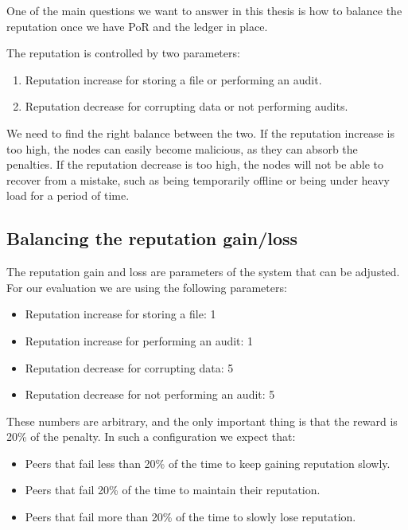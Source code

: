 
One of the main questions we want to answer in this thesis is
how to balance the reputation once we have PoR and the ledger in place.

The reputation is controlled by two parameters:
\begin{enumerate}
  \item Reputation increase for storing a file or performing an audit.
  \item Reputation decrease for corrupting data or not performing audits.
\end{enumerate}

We need to find the right balance between the two.
If the reputation increase is too high, the nodes can easily become malicious,
as they can absorb the penalties.
If the reputation decrease is too high, the nodes will not be able to recover from a mistake,
such as being temporarily offline or being under heavy load for a period of time.

\subsection{Balancing the reputation gain/loss}
\label{section:balancing}

The reputation gain and loss are parameters of the system that can be adjusted.
For our evaluation we are using the following parameters:
\begin{itemize}
  \item Reputation increase for storing a file: 1
  \item Reputation increase for performing an audit: 1
  \item Reputation decrease for corrupting data: 5
  \item Reputation decrease for not performing an audit: 5
\end{itemize}

These numbers are arbitrary, and the only important thing is that the reward is 20\% of the penalty.
In such a configuration we expect that:
\begin{itemize}
  \item Peers that fail less than 20\% of the time to keep gaining reputation slowly.
  \item Peers that fail 20\% of the time to maintain their reputation.
  \item Peers that fail more than 20\% of the time to slowly lose reputation.
\end{itemize}

